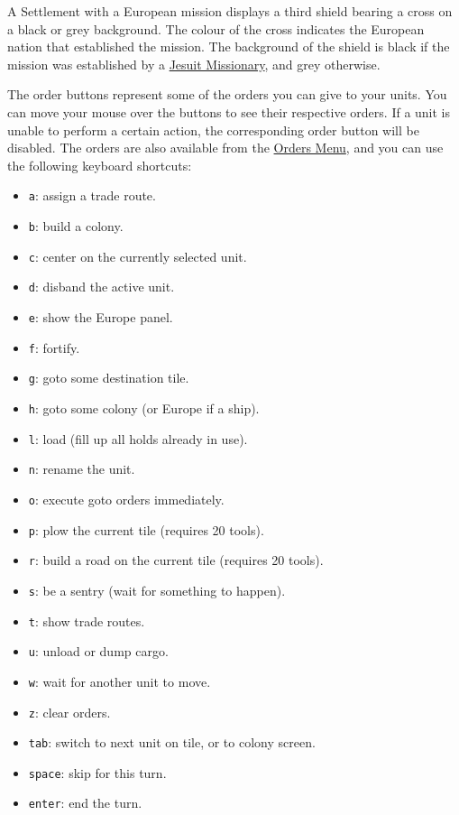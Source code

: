 \documentclass[12pt]{book}
\begin{document}
A Settlement with a European mission displays a third shield bearing a
cross on a black or grey background. The colour of the cross indicates
the European nation that established the mission. The background of
the shield is black if the mission was established by a
\hyperlink{Jesuit Missionary}{Jesuit Missionary}, and grey otherwise.

The order buttons represent some of the orders you can give to your
units. You can move your mouse over the buttons to see their
respective orders. If a unit is unable to perform a certain action,
the corresponding order button will be disabled. The orders are also
available from the \hyperlink{orders menu}{Orders Menu}, and you can
use the following \hypertarget{keyboard shortcuts}{keyboard shortcuts}:

\pagebreak[2]
\begin{itemize}
\item\verb$a$: assign a trade route.
\item\verb$b$: build a colony.
\item\verb$c$: center on the currently selected unit.
\item\verb$d$: disband the active unit.
\item\verb$e$: show the Europe panel.
\item\verb$f$: fortify.
\item\verb$g$: goto some destination tile.
\item\verb$h$: goto some colony (or Europe if a ship).
\item\verb$l$: load (fill up all holds already in use).
\item\verb$n$: rename the unit.
\item\verb$o$: execute goto orders immediately.
\item\verb$p$: plow the current tile (requires 20 tools).
\item\verb$r$: build a road on the current tile (requires 20 tools).
\item\verb$s$: be a sentry (wait for something to happen).
\item\verb$t$: show trade routes.
\item\verb$u$: unload or dump cargo.
\item\verb$w$: wait for another unit to move.
\item\verb$z$: clear orders.
\item\verb$tab$: switch to next unit on tile, or to colony screen.
\item\verb$space$: skip for this turn.
\item\verb$enter$: end the turn.

\end{itemize}
\end{document}
